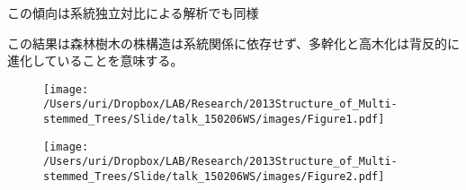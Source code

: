 \documentclass[a0, 36pt, plainboxedsections]{sciposter} %
\begin{document}
\begin{multicols}{2}
\begin{list}{}{\setlength{\itemindent}{1em}}
  \item この傾向は系統独立対比による解析でも同様
\end{list}

この結果は森林樹木の株構造は系統関係に依存せず、多幹化と高木化は背反的に進化していることを意味する。

\begin{figure}
	\begin{center}
		\texttt{[image: /Users/uri/Dropbox/LAB/Research/2013Structure\_of\_Multi-stemmed\_Trees/Slide/talk\_150206WS/images/Figure1.pdf]}
		
		\texttt{[image: /Users/uri/Dropbox/LAB/Research/2013Structure\_of\_Multi-stemmed\_Trees/Slide/talk\_150206WS/images/Figure2.pdf]}
	\end{center}
\end{figure}

\end{multicols}
\begin{mdframed}[style=section.frame]
  \centering\huge\textbf{}
\end{mdframed}
\end{document}
